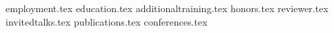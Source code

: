 \documentclass[11pt, a4paper]{awesome-cv}
\newcommand*{\sectiondir}{sections/}
\begin{document}
\makecvheader

{employment.tex}
{education.tex}
{additionaltraining.tex}
{honors.tex}
\newpage
{reviewer.tex}
{invitedtalks.tex}
{publications.tex}
{conferences.tex}
\end{document}
